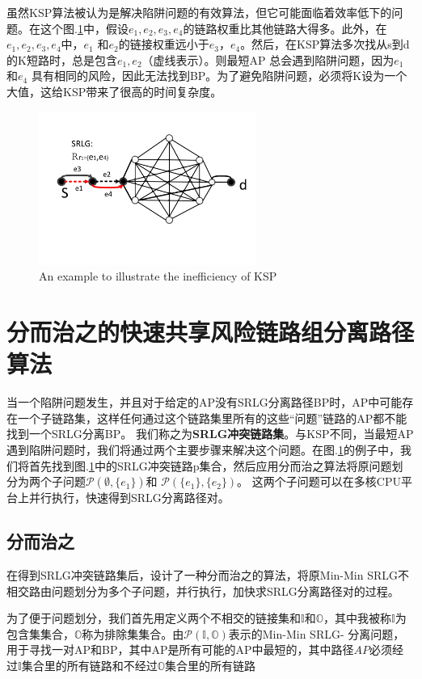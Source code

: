 虽然KSP算法被认为是解决陷阱问题的有效算法，但它可能面临着效率低下的问题。在这个图.\ref{fig:KSPproblem}中，假设$e_1, e_2, e_3, e_4$的链路权重比其他链路大得多。此外，在$e_1, e_2, e_3, e_4$中，$e_1$ 和$e_2$的链接权重远小于$e_3$，$e_4$。然后，在KSP算法多次找从s到d的K短路时，总是包含$e_1,e_2$（虚线表示）。则最短AP 总会遇到陷阱问题，因为$e_1$和$e_4$ 具有相同的风险，因此无法找到BP。为了避免陷阱问题，必须将K设为一个大值，这给KSP带来了很高的时间复杂度。
\begin{figure}[htbp]
\centering
\includegraphics[width=2.8in]{figures/KSPproblem}
  \caption{An example to illustrate the inefficiency of KSP}
  \label{fig:KSPproblem}
\end{figure}


\section{分而治之的快速共享风险链路组分离路径算法}
当一个陷阱问题发生，并且对于给定的AP没有SRLG分离路径BP时，AP中可能存在一个子链路集，这样任何通过这个链路集里所有的这些“问题”链路的AP都不能找到一个SRLG分离BP。 我们称之为\textbf{SRLG冲突链路集}。与KSP不同，当最短AP遇到陷阱问题时，我们将通过两个主要步骤来解决这个问题。在图.\ref{fig:KSPproblem}的例子中，我们将首先找到图.\ref{fig:KSPproblem}中的SRLG冲突链路p集合，然后应用分而治之算法将原问题划分为两个子问题$\mathcal{P}(\emptyset,\{e_1\})$和 $\mathcal{P}(\{e_1\},\{e_2\})$。 这两个子问题可以在多核CPU平台上并行执行，快速得到SRLG分离路径对。
\subsection{分而治之}
在得到SRLG冲突链路集后，设计了一种分而治之的算法，将原Min-Min SRLG不相交路由问题划分为多个子问题，并行执行，加快求SRLG分离路径对的过程。

为了便于问题划分，我们首先用定义两个不相交的链接集和$\mathbb{I}$和$\mathbb{O}$，其中我被称$\mathbb{I}$为包含集集合，$\mathbb{O}$称为排除集集合。由$\mathcal{P}({\mathbb{I},\mathbb{O}})$表示的Min-Min SRLG- 分离问题，用于寻找一对AP和BP，其中AP是所有可能的AP中最短的，其中路径$AP$必须经过$\mathbb{I}$集合里的所有链路和不经过$\mathbb{O}$集合里的所有链路

